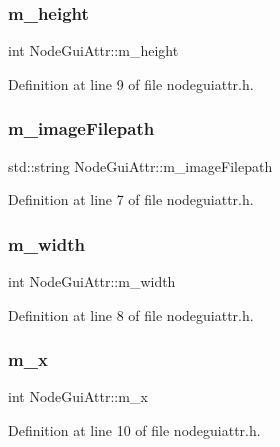 \subsubsection{\texorpdfstring{m\+\_\+height}{m\_height}}
{\footnotesize\ttfamily int Node\+Gui\+Attr\+::m\+\_\+height}



Definition at line 9 of file nodeguiattr.\+h.

\mbox{\label{struct_node_gui_attr_ae8361faefecd978e2a749e0e838af86b}} 
\subsubsection{\texorpdfstring{m\+\_\+image\+Filepath}{m\_imageFilepath}}
{\footnotesize\ttfamily std\+::string Node\+Gui\+Attr\+::m\+\_\+image\+Filepath}



Definition at line 7 of file nodeguiattr.\+h.

\mbox{\label{struct_node_gui_attr_ad9b18df17570cefcd755bcee9d7d3cdb}} 
\subsubsection{\texorpdfstring{m\+\_\+width}{m\_width}}
{\footnotesize\ttfamily int Node\+Gui\+Attr\+::m\+\_\+width}



Definition at line 8 of file nodeguiattr.\+h.

\mbox{\label{struct_node_gui_attr_a1e4e5581cf2ed1f47398a14a65d4598f}} 
\subsubsection{\texorpdfstring{m\+\_\+x}{m\_x}}
{\footnotesize\ttfamily int Node\+Gui\+Attr\+::m\+\_\+x}



Definition at line 10 of file nodeguiattr.\+h.

